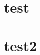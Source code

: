 \documentclass{fortythree_resume}
\begin{document}

\begin{minipage}[t]{0.33\textwidth} 
\section{test}
\end{minipage}
\hfill
\begin{minipage}[t]{0.66\textwidth} 
\section{test2}
\end{minipage}
\end{document}
